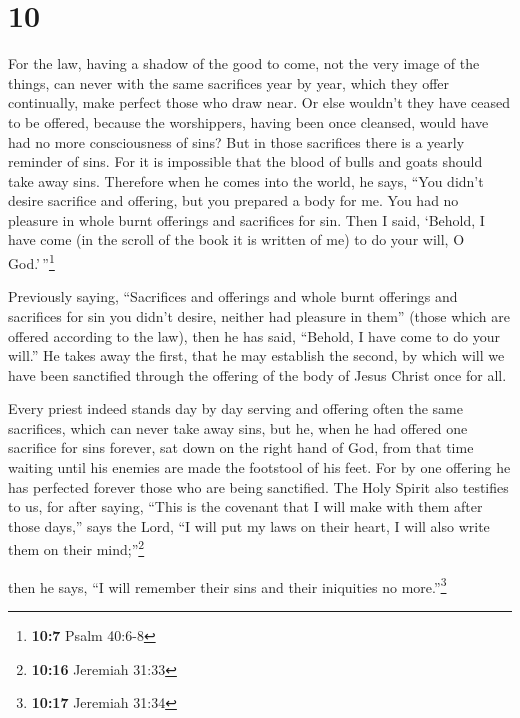 \hypertarget{section-9}{%
\section{10}\label{section-9}}

 For the law, having a shadow of the good to come, not the
very image of the things, can never with the same sacrifices year by
year, which they offer continually, make perfect those who draw near.
 Or else wouldn't they have ceased to be offered, because
the worshippers, having been once cleansed, would have had no more
consciousness of sins?  But in those sacrifices there is a
yearly reminder of sins.  For it is impossible that the
blood of bulls and goats should take away sins.  Therefore
when he comes into the world, he says, ``You didn't desire sacrifice and
offering, but you prepared a body for me.  You had no
pleasure in whole burnt offerings and sacrifices for sin. 
Then I said, `Behold, I have come (in the scroll of the book it is
written of me) to do your will, O God.'\,''\footnote{\textbf{10:7} Psalm
  40:6-8}

 Previously saying, ``Sacrifices and offerings and whole
burnt offerings and sacrifices for sin you didn't desire, neither had
pleasure in them'' (those which are offered according to the law),
 then he has said, ``Behold, I have come to do your
will.'' He takes away the first, that he may establish the second,
 by which will we have been sanctified through the
offering of the body of Jesus Christ once for all.

 Every priest indeed stands day by day serving and
offering often the same sacrifices, which can never take away sins,
 but he, when he had offered one sacrifice for sins
forever, sat down on the right hand of God,  from that
time waiting until his enemies are made the footstool of his feet.
 For by one offering he has perfected forever those who
are being sanctified.  The Holy Spirit also testifies to
us, for after saying,  ``This is the covenant that I will
make with them after those days,'' says the Lord, ``I will put my laws
on their heart, I will also write them on their mind;''\footnote{\textbf{10:16}
  Jeremiah 31:33}

then he says,  ``I will remember their sins and their
iniquities no more.''\footnote{\textbf{10:17} Jeremiah 31:34}

